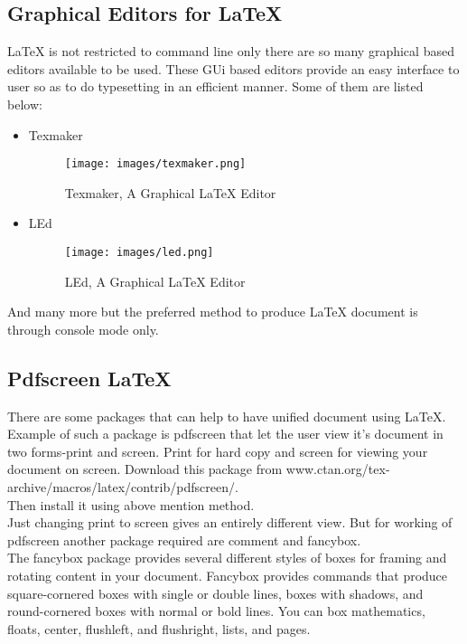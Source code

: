 \subsection{Graphical Editors for \LaTeX{}}
\LaTeX{} is not restricted to command line only there are so many graphical based editors available to be used. These GUi based editors provide an easy interface to user so as to do typesetting in an efficient manner. Some of them are listed below:
\begin{itemize}
\item {Texmaker}
\begin{figure}[ht]
\centering
\texttt{[image: images/texmaker.png]}
\caption{Texmaker, A Graphical \LaTeX{} Editor}
\end{figure}
\item LEd
\begin{figure}[ht]
\centering
\texttt{[image: images/led.png]}
\caption{LEd, A Graphical \LaTeX{} Editor}
\end{figure}
\end{itemize}
And many more but the preferred method to produce \LaTeX{} document is through console mode only.


\subsection{Pdfscreen \LaTeX{}}
There are some packages that can help to have unified document using \LaTeX{}. Example of such a package is pdfscreen that let the user view it’s document in two forms-print and screen. Print for hard copy and screen for viewing your document on screen. Download this package from www.ctan.org/tex-archive/macros/latex/contrib/pdfscreen/.\\
Then install it using above mention method.\\

Just changing print to screen gives an entirely different view. But for working of pdfscreen another package required are comment and fancybox.\\

The fancybox package provides several different styles of boxes for framing and rotating content in your document. Fancybox provides commands that produce square-cornered boxes with single or double lines, boxes with shadows, and round-cornered boxes with normal or bold lines. You can box mathematics, floats, center, flushleft, and flushright, lists, and pages.\\

